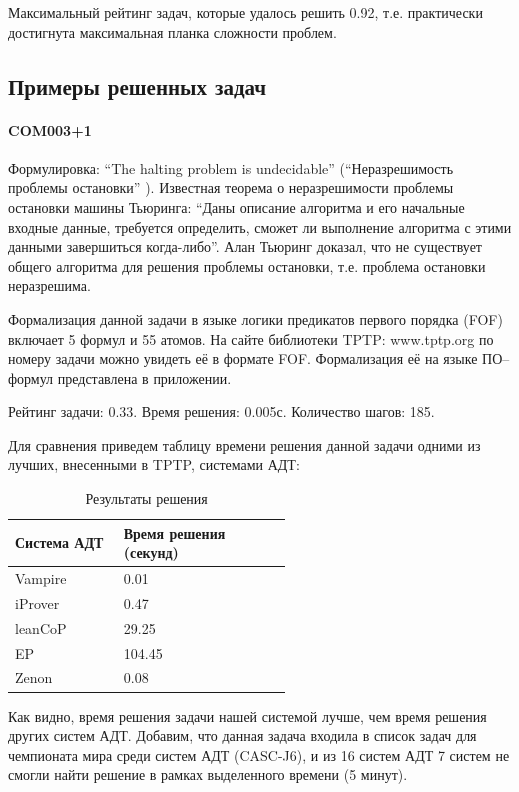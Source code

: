 Максимальный рейтинг задач, которые удалось решить 0.92, т.е. практически достигнута максимальная планка сложности проблем.




\subsection{Примеры решенных задач}

\paragraph{COM003+1}
Формулировка: ``The halting problem is undecidable'' (``Неразрешимость проблемы остановки'' \cite{turing}). Известная теорема о неразрешимости проблемы остановки машины Тьюринга: ``Даны описание алгоритма и его начальные входные данные, требуется определить, сможет ли выполнение алгоритма с этими данными завершиться когда-либо''. Алан Тьюринг доказал, что не существует общего алгоритма для решения проблемы остановки, т.е. проблема остановки неразрешима.

Формализация данной задачи в языке логики предикатов первого порядка (FOF) включает 5 формул и 55 атомов. На сайте библиотеки TPTP: www.tptp.org по номеру задачи можно увидеть её в формате FOF. Формализация её на языке ПО--формул представлена в приложении.

Рейтинг задачи: 0.33. Время решения: 0.005с. Количество шагов: 185.

Для сравнения приведем таблицу времени решения данной задачи одними из лучших, внесенными в TPTP, системами АДТ:

\begin{longtable}[H]{|p{0.2\linewidth}|p{0.35\linewidth}|}
\caption{Результаты решения}\\
\hline
\textbf{Система АДТ} & \textbf{Время решения (секунд)}  \\
\hline
Vampire & 0.01 \\
\hline
iProver & 0.47 \\
\hline
leanCoP & 29.25 \\
\hline
EP & 104.45  \\
\hline
Zenon & 0.08 \\
\hline
\end{longtable}


Как видно, время решения задачи нашей системой лучше, чем время решения других систем АДТ. Добавим, что данная задача входила в список задач для чемпионата мира среди систем АДТ (CASC-J6), и из 16 систем АДТ 7 систем не смогли найти решение в рамках выделенного времени (5 минут).

